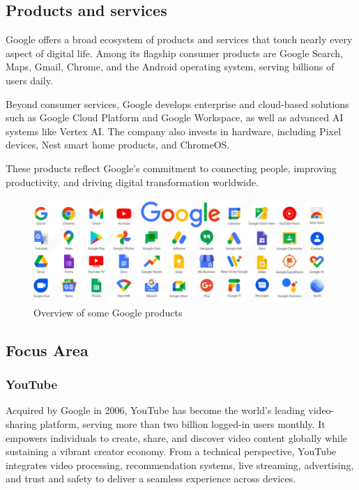 \begin{spacing}{1.2}
\subsection{Products and services} 
Google offers a broad ecosystem of products and services that touch nearly every aspect of digital life. Among its flagship consumer products are Google Search, Maps, Gmail, Chrome, and the Android operating system, serving billions of users daily. 

Beyond consumer services, Google develops enterprise and cloud-based solutions such as Google Cloud Platform and Google Workspace, as well as advanced AI systems like Vertex AI. The company also invests in hardware, including Pixel devices, Nest smart home products, and ChromeOS. 

These products reflect Google’s commitment to connecting people, improving productivity, and driving digital transformation worldwide.

\begin{figure}[!ht]\centering
\includegraphics[scale=1.1]{Images/google_products.jpg}
\caption{Overview of some Google products}
\label{fig:google_products}
\end{figure}

\subsection{Focus Area} 
\subsubsection{YouTube}
Acquired by Google in 2006, YouTube has become the world’s leading video-sharing platform, serving more than two billion logged-in users monthly. It empowers individuals to create, share, and discover video content globally while sustaining a vibrant creator economy. From a technical perspective, YouTube integrates video processing, recommendation systems, live streaming, advertising, and trust and safety to deliver a seamless experience across devices.


\end{spacing}
